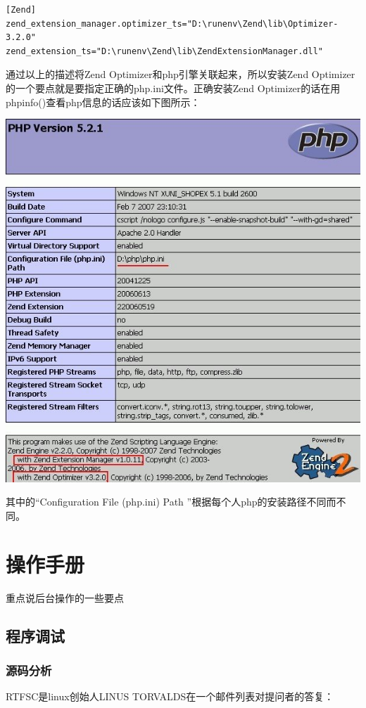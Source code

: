 \documentclass{article}
\begin{document}
\begin{verbatim}
[Zend]
zend_extension_manager.optimizer_ts="D:\runenv\Zend\lib\Optimizer-3.2.0"
zend_extension_ts="D:\runenv\Zend\lib\ZendExtensionManager.dll"
\end{verbatim}
通过以上的描述将Zend Optimizer和php引擎关联起来，所以安装Zend Optimizer的一个要点就是要指定正确的php.ini文件。正确安装Zend Optimizer的话在用phpinfo()查看php信息的话应该如下图所示：  

\includegraphics{img/install/windows/zend/9.jpg}

其中的“Configuration File (php.ini) Path ”根据每个人php的安装路径不同而不同。

\clearpage

\hypertarget{toc12}{}
\section{操作手册}
重点说后台操作的一些要点

\hypertarget{toc13}{}
\subsection{程序调试}
\hypertarget{toc14}{}
\subsubsection{源码分析}
RTFSC是linux创始人LINUS TORVALDS在一个邮件列表对提问者的答复：
\end{document}
